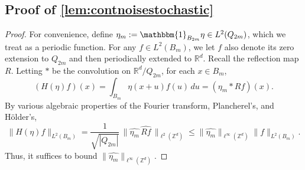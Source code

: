 \documentclass[11pt]{article}
\theoremstyle{definition}
\numberwithin{theorem}{section}
\numberwithin{lemma}{section}
\numberwithin{equation}{section}
\def\R{\mathbb{R}}
\def\Z{\mathbb{Z}}
\renewcommand{\hat}{\widehat}
\newcommand{\bbone}{\mathbbm{1}}
\numberwithin{equation}{section}
\begin{document}
\subsection{Proof of \cref{lem:contnoisestochastic}}
\label{proof:contnoisestochastic}

	\begin{proof}
		For convenience, define $\eta_m:=\bbone_{B_{2m}} \eta\in L^2(Q_{2m})$, which we treat as a periodic function. For any $f\in L^2(B_m)$, we let $f$ also denote its zero extension to $Q_{2m}$ and then periodically extended to $\R^d$. Recall the reflection map $R$. Letting $*$ be the convolution on $\R^d/Q_{2m}$, for each $x\in B_m$,
		$$
		(H(\eta)f)(x)
		= \int_{B_m} \eta(x +u) f(u)\, du 
		= (\eta_m* Rf)(x).
		$$
		By various algebraic properties of the Fourier transform, Plancherel's, and H\"older's, 
		\begin{equation}
			\label{eq:etahelp1}
			\|H(\eta)f\|_{L^2(B_m)}
			= \frac{1}{\sqrt{|Q_{2m}|}} \, \big\| \hat{\eta_m} \,  \hat{Rf} \, \big\|_{\ell^2(\Z^d)} 
			\leq \|\hat{\eta_m}\|_{\ell^\infty(\Z^d)} \|f\|_{L^2(B_m)}.
		\end{equation}
		Thus, it suffices to bound $\|\hat{\eta_m}\|_{\ell^\infty(\Z^d)}$. 
		

\end{proof}
\end{document}
